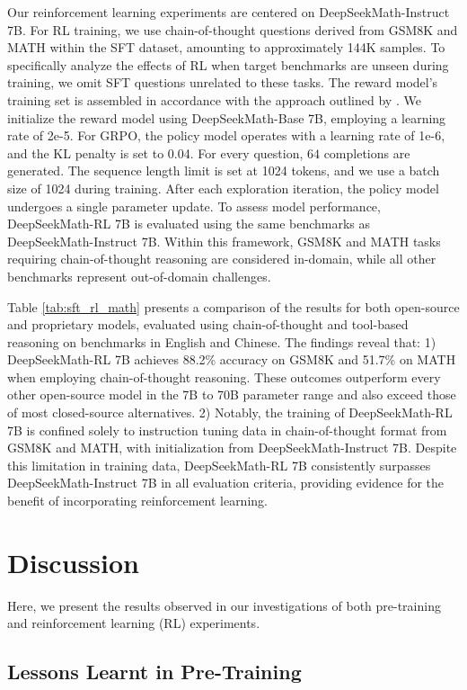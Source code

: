 \begin{itemize}[topsep=0pt]
\begin{itemize}[topsep=0pt]
Our reinforcement learning experiments are centered on DeepSeekMath-Instruct 7B. For RL training, we use chain-of-thought questions derived from GSM8K and MATH within the SFT dataset, amounting to approximately 144K samples. To specifically analyze the effects of RL when target benchmarks are unseen during training, we omit SFT questions unrelated to these tasks. The reward model’s training set is assembled in accordance with the approach outlined by \citep{wang2023math}. We initialize the reward model using DeepSeekMath-Base 7B, employing a learning rate of 2e-5. For GRPO, the policy model operates with a learning rate of 1e-6, and the KL penalty is set to 0.04. For every question, $64$ completions are generated. The sequence length limit is set at 1024 tokens, and we use a batch size of 1024 during training. After each exploration iteration, the policy model undergoes a single parameter update. To assess model performance, DeepSeekMath-RL 7B is evaluated using the same benchmarks as DeepSeekMath-Instruct 7B. Within this framework, GSM8K and MATH tasks requiring chain-of-thought reasoning are considered in-domain, while all other benchmarks represent out-of-domain challenges.

Table \ref{tab:sft_rl_math} presents a comparison of the results for both open-source and proprietary models, evaluated using chain-of-thought and tool-based reasoning on benchmarks in English and Chinese. The findings reveal that: 1) DeepSeekMath-RL 7B achieves 88.2\% accuracy on GSM8K and 51.7\% on MATH when employing chain-of-thought reasoning. These outcomes outperform every other open-source model in the 7B to 70B parameter range and also exceed those of most closed-source alternatives. 2) Notably, the training of DeepSeekMath-RL 7B is confined solely to instruction tuning data in chain-of-thought format from GSM8K and MATH, with initialization from DeepSeekMath-Instruct 7B. Despite this limitation in training data, DeepSeekMath-RL 7B consistently surpasses DeepSeekMath-Instruct 7B in all evaluation criteria, providing evidence for the benefit of incorporating reinforcement learning.

\section{Discussion}
Here, we present the results observed in our investigations of both pre-training and reinforcement learning (RL) experiments.

\subsection{Lessons Learnt in Pre-Training}


\end{itemize}
\end{itemize}
